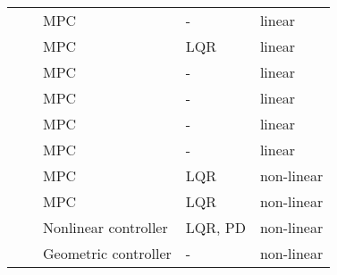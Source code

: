 \begin{landscape}
\begin{tiny}
\begin{table}[!htbp]
\begin{tabularx}{\linewidth}{@{}lllll@{}}
        \citet{Santos2016}           & \citeyear{Santos2016}           & MPC                                                                    & -                                                                      & linear               \\
        \citet{Andrade2016}          & \citeyear{Andrade2016}          & MPC                                                                    & LQR                                                                    & linear               \\
        \citet{Zurn2016}             & \citeyear{Zurn2016}             & MPC                                                                    & -                                                                      & linear               \\
        \citet{Son2019}              & \citeyear{Son2019}              & MPC                                                                    & -                                                                      & linear               \\
        \citet{Son2018}              & \citeyear{Son2018}              & MPC                                                                    & -                                                                      & linear               \\
        \citet{Son2017}              & \citeyear{Son2017}              & MPC                                                                    & -                                                                      & linear               \\
        \citet{Trachte2014}          & \citeyear{Trachte2014}          & MPC                                                                    & LQR                                                                    & non-linear           \\
        \citet{Trachte2015}          & \citeyear{Trachte2015}          & MPC                                                                    & LQR                                                                    & non-linear           \\
        \citet{Liang2021}            & \citeyear{Liang2021}            & Nonlinear controller                                                   & LQR, PD                                                                & non-linear           \\
        \citet{Zeng2019a}            & \citeyear{Zeng2019a}            & Geometric controller                                                   & -                                                                      & non-linear           \\

\end{tabularx}
\end{table}
\end{tiny}
\end{landscape}

